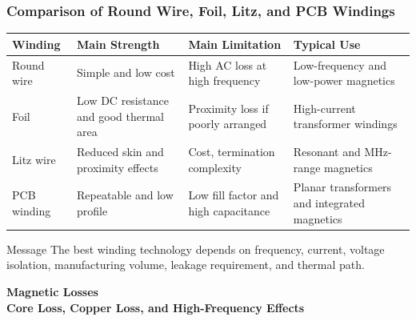 \begin{frame}
    \frametitle{Comparison of Round Wire, Foil, Litz, and PCB Windings}

    \scriptsize
    \begin{table}
        \centering
        \begin{tabular}{p{}p{}p{}p{}}
            \hline
            \textbf{Winding} & \textbf{Main Strength} & \textbf{Main Limitation} & \textbf{Typical Use}\\
            \hline
            Round wire & Simple and low cost & High AC loss at high frequency & Low-frequency and low-power magnetics\\
            Foil & Low DC resistance and good thermal area & Proximity loss if poorly arranged & High-current transformer windings\\
            Litz wire & Reduced skin and proximity effects & Cost, termination complexity & Resonant and MHz-range magnetics\\
            PCB winding & Repeatable and low profile & Low fill factor and high capacitance & Planar transformers and integrated magnetics\\
            \hline
        \end{tabular}
    \end{table}

    \vspace{0.15cm}

    \begin{block}{Message}
        \small
        The best winding technology depends on frequency, current, voltage isolation, manufacturing volume, leakage requirement, and thermal path.
    \end{block}
\end{frame}


\begin{frame}
\begin{center}
  \textbf{\Huge{Magnetic Losses}}\\[0.4cm]
  \textbf{\Large{Core Loss, Copper Loss, and High-Frequency Effects}}
\end{center}
\end{frame}


